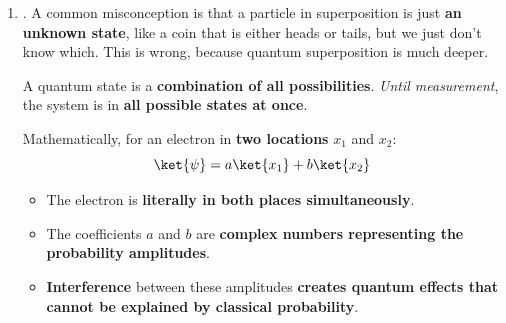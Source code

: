 \begin{enumerate}
    \highspace
    In summary, the double-slit experiment demonstrates the principle of quantum superposition. When quantum particles such as photons or electrons are sent one at a time through two slits, they form an interference pattern on a detection screen. This indicates that each particle behaves as if it travels through both slits simultaneously, corresponding to the superposition:
    \begin{equation*}
        \ket{\psi} = \frac{1}{\sqrt{2}}\left(\ket{\text{slit 1}} + \ket{\text{slit 2}}\right)
    \end{equation*}
    If a measurement is performed to determine which slit the particle passes through, the interference pattern disappears due to decoherence, and the system behaves like a classical probabilistic mixture.
    \begin{center}
        \href{https://youtu.be/A9tKncAdlHQ}{\emph{Double Slit Experiment explained! by Jim Al-Khalili}}\hspace{2em}
    \end{center}


    \item {}. A common misconception is that a particle in superposition is just \textbf{an unknown state}, like a coin that is either heads or tails, but we just don't know which. This is wrong, because quantum superposition is much deeper.

    A quantum state is a \textbf{combination of all possibilities}. \emph{Until measurement}, the system is in \textbf{all possible states at once}.
    
    Mathematically, for an electron in \textbf{two locations} $x_{1}$ and $x_{2}$:
    \begin{equation*}
        \ket{\psi} = a \ket{x_{1}} + b \ket{x_{2}}
    \end{equation*}
    \begin{itemize}
        \item The electron is \textbf{literally in both places simultaneously}.
        \item The coefficients $a$ and $b$ are \textbf{complex numbers representing the probability amplitudes}.
        \item \textbf{Interference} between these amplitudes \textbf{creates quantum effects that cannot be explained by classical probability}.
    \end{itemize}



\end{enumerate}
